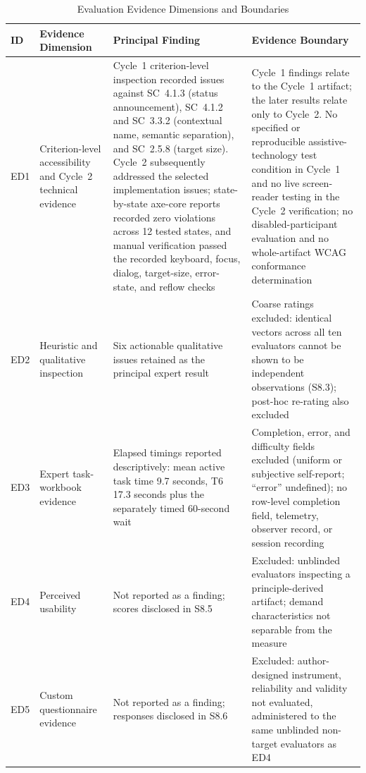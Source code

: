 \documentclass[journal]{IEEEtran}
\renewcommand{\arraystretch}{1.08}
\begin{document}
\begin{table}[!t]
\caption{Evaluation Evidence Dimensions and Boundaries}
\label{tab:evidence-dimensions-results}
\centering
\footnotesize
\renewcommand{\arraystretch}{1.08}
\begin{tabularx}{\textwidth}{p{}p{}X X}
\toprule
\textbf{ID} & \textbf{Evidence Dimension} & \textbf{Principal Finding} & \textbf{Evidence Boundary} \\
\midrule
ED1 & Criterion-level accessibility and Cycle~2 technical evidence & Cycle~1 criterion-level inspection recorded issues against SC~4.1.3 (status announcement), SC~4.1.2 and SC~3.3.2 (contextual name, semantic separation), and SC~2.5.8 (target size). Cycle~2 subsequently addressed the selected implementation issues; state-by-state axe-core reports recorded zero violations across 12 tested states, and manual verification passed the recorded keyboard, focus, dialog, target-size, error-state, and reflow checks & Cycle~1 findings relate to the Cycle~1 artifact; the later results relate only to Cycle~2. No specified or reproducible assistive-technology test condition in Cycle~1 and no live screen-reader testing in the Cycle~2 verification; no disabled-participant evaluation and no whole-artifact WCAG conformance determination \\
ED2 & Heuristic and qualitative inspection & Six actionable qualitative issues retained as the principal expert result & Coarse ratings excluded: identical vectors across all ten evaluators cannot be shown to be independent observations (S8.3); post-hoc re-rating also excluded \\
ED3 & Expert task-workbook evidence & Elapsed timings reported descriptively: mean active task time 9.7 seconds, T6 17.3 seconds plus the separately timed 60-second wait & Completion, error, and difficulty fields excluded (uniform or subjective self-report; ``error'' undefined); no row-level completion field, telemetry, observer record, or session recording \\
ED4 & Perceived usability & Not reported as a finding; scores disclosed in S8.5 & Excluded: unblinded evaluators inspecting a principle-derived artifact; demand characteristics not separable from the measure \\
ED5 & Custom questionnaire evidence & Not reported as a finding; responses disclosed in S8.6 & Excluded: author-designed instrument, reliability and validity not evaluated, administered to the same unblinded non-target evaluators as ED4 \\
\bottomrule
\end{tabularx}
\end{table}
\end{document}
